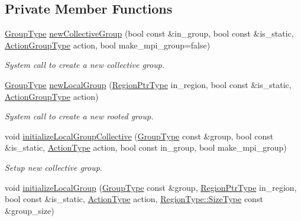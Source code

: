 \subsection*{Private Member Functions}
\begin{DoxyCompactItemize}
\item 
\hyperlink{namespacevt_a27b5e4411c9b6140c49100e050e2f743}{Group\+Type} \hyperlink{structvt_1_1group_1_1_group_manager_a87de53bad0462026b6f497b101d72edb}{new\+Collective\+Group} (bool const \&in\+\_\+group, bool const \&is\+\_\+static, \hyperlink{structvt_1_1group_1_1_group_manager_ae871c5871ad62b530220009c1ee4d4b9}{Action\+Group\+Type} action, bool make\+\_\+mpi\+\_\+group=false)
\begin{DoxyCompactList}\small\item\em System call to create a new collective group. \end{DoxyCompactList}\item 
\hyperlink{namespacevt_a27b5e4411c9b6140c49100e050e2f743}{Group\+Type} \hyperlink{structvt_1_1group_1_1_group_manager_a1f02ae4eea702903d0dc74308f981a60}{new\+Local\+Group} (\hyperlink{structvt_1_1group_1_1_group_manager_a9192e585fc2f99bfd5a6ff65fc21c40b}{Region\+Ptr\+Type} in\+\_\+region, bool const \&is\+\_\+static, \hyperlink{structvt_1_1group_1_1_group_manager_ae871c5871ad62b530220009c1ee4d4b9}{Action\+Group\+Type} action)
\begin{DoxyCompactList}\small\item\em System call to create a new rooted group. \end{DoxyCompactList}\item 
void \hyperlink{structvt_1_1group_1_1_group_manager_ab46558b65172c33245fdd418251674b2}{initialize\+Local\+Group\+Collective} (\hyperlink{namespacevt_a27b5e4411c9b6140c49100e050e2f743}{Group\+Type} const \&group, bool const \&is\+\_\+static, \hyperlink{namespacevt_ae0a5a7b18cc99d7b732cb4d44f46b0f3}{Action\+Type} action, bool const in\+\_\+group, bool make\+\_\+mpi\+\_\+group)
\begin{DoxyCompactList}\small\item\em Setup new collective group. \end{DoxyCompactList}\item 
void \hyperlink{structvt_1_1group_1_1_group_manager_a8c8c81c05d6afab0fcb357b7ab0b7b1b}{initialize\+Local\+Group} (\hyperlink{namespacevt_a27b5e4411c9b6140c49100e050e2f743}{Group\+Type} const \&group, \hyperlink{structvt_1_1group_1_1_group_manager_a9192e585fc2f99bfd5a6ff65fc21c40b}{Region\+Ptr\+Type} in\+\_\+region, bool const \&is\+\_\+static, \hyperlink{namespacevt_ae0a5a7b18cc99d7b732cb4d44f46b0f3}{Action\+Type} action, \hyperlink{structvt_1_1group_1_1region_1_1_region_a9bb381adf31111aae34dbc644bad6c1f}{Region\+Type\+::\+Size\+Type} const \&group\+\_\+size)

\end{DoxyCompactItemize}
